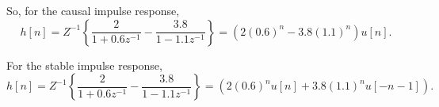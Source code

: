 So, for the causal impulse response,
\begin{equation}
    h[n] = {Z^{ - 1}}\left\{ {\frac{2}{{1 + 0.6{z^{ - 1}}}} - \frac{{3.8}}{{1 - 1.1{z^{ - 1}}}}} \right\} = \left( {2{{\left( {0.6} \right)}^n} - 3.8{{\left( {1.1} \right)}^n}} \right)u[n].
\end{equation}

For the stable impulse response,
\begin{equation}
    h[n] = {Z^{ - 1}}\left\{ {\frac{2}{{1 + 0.6{z^{ - 1}}}} - \frac{{3.8}}{{1 - 1.1{z^{ - 1}}}}} \right\} = \left( {2{{\left( {0.6} \right)}^n}u[n] + 3.8{{\left( {1.1} \right)}^n}u[ - n - 1]} \right).
\end{equation}







